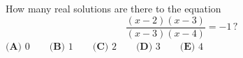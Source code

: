 How many real solutions are there to the equation
\[\dfrac{(x-2)(x-3)}{(x-3)(x-4)}=-1\,?\]
$\textbf{(A) }0\qquad\textbf{(B) }1\qquad\textbf{(C) }2\qquad\textbf{(D) }3\qquad\textbf{(E) }4$

